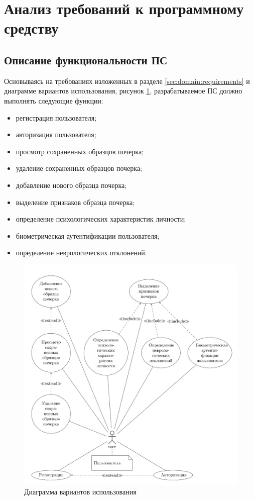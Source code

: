 \section{Анализ требований к программному средству}
\label{sec:freq}
\subsection{Описание функциональности ПС}
Основываясь на требованиях изложенных в разделе \ref{sec:domain:requirements} и диаграмме вариантов использования, рисунок \ref{fig:freg:usecase}, разрабатываемое ПС должно выполнять следующие функции:

\begin{itemize}
	\item регистрация пользователя;
	\item авторизация пользователя;
	\item просмотр сохраненных образцов почерка;
	\item удаление сохраненных образцов почерка;
	\item добавление нового образца почерка;
	\item выделение признаков образца почерка;
	\item определение психологических характеристик личности;
	\item биометрическая аутентификации пользователя;
	\item определение неврологических отклонений.
\end{itemize}

\begin{figure}[ht]
\centering
    \includegraphics[scale=1.9]{figures/use_case.png}  
    \caption{Диаграмма вариантов использования}
  \label{fig:freg:usecase}
\end{figure}

